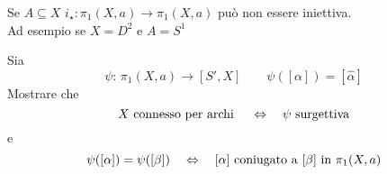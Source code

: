 \begin{oss}Se $A\subseteq X$  $i_\star:\pi_1(X,a)\to \pi_1(X,a)$ pu\`o non essere iniettiva.\\
Ad esempio se $X=D^2$ e $A=S^1$
\end{oss}
\begin{ex} Sia 
$$ \psi:\, \pi_1(X,a)\to [S',X] \qquad \psi([\alpha])=[\hat{\alpha}]$$
Mostrare che 
$$ X \text{ connesso per archi }\quad \Leftrightarrow \quad \psi \text{ surgettiva}$$
e
$$ \psi([\alpha])=\psi([\beta])\quad \Leftrightarrow \quad [\alpha] \text{ coniugato a } [\beta] \text{ in } \pi_1(X,a)$$
\end{ex}
